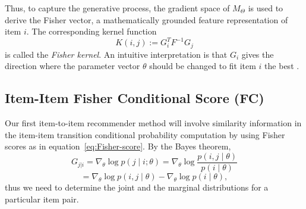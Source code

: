 \documentclass[preprint]{sig-alternate-05-2015}
\begin{document}
Thus, to capture the generative process, the gradient space of $M_\Theta$ is used to derive the Fisher vector, a mathematically grounded feature representation of item $i$. The corresponding kernel function 
%
\begin{equation}
K(i,j):= G^T_iF^{-1}G_j
\label{eq:Fisher-kernel}
\end{equation}
%
is called the {\em Fisher kernel}. An intuitive interpretation is that $G_i$ gives the direction where the parameter vector $\theta$ should be changed to fit item $i$ the best \cite{perronnin2007fisher}.

\subsection{Item-Item Fisher Conditional Score (FC)}
\label{sec:fs_rank}
\label{sect:FC}

Our first item-to-item recommender method will involve similarity information in the item-item transition conditional probability computation by using Fisher scores as in equation~\eqref{eq:Fisher-score}.
By the Bayes theorem,
%
\begin{equation*}
G_{j|i} = \nabla_{\theta} \log p(j \mid i; \theta) = \nabla_{\theta} \log \frac{p(i,j \mid \theta)}{p(i \mid \theta)}
\nonumber
\end{equation*}
%
\begin{equation}
= \nabla_{\theta} \log p(i,j \mid \theta) - \nabla_{\theta} \log p(i \mid \theta),
\label{eq:fisher_score_cond}
\end{equation}
%
thus we need to determine the joint and the marginal distributions for a particular item pair. 
\end{document}
